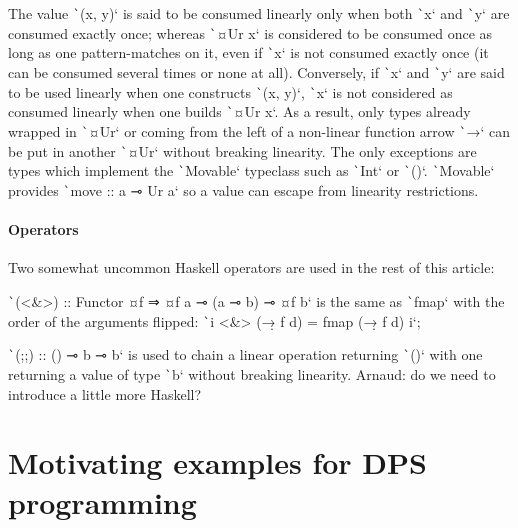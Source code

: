 \documentclass[english]{jflart}
\newcommand{\TODO}[1]{{\color{red}\large #1}}
\begin{document}
The value \texttt`(x, y)` is said to be consumed linearly only when both \texttt`x` and \texttt`y` are consumed exactly once; whereas \texttt`¤Ur x` is considered to be consumed once as long as one pattern-matches on it, even if \texttt`x` is not consumed exactly once (it can be consumed several times or none at all). Conversely, if \texttt`x` and \texttt`y` are said to be used linearly when one constructs \texttt`(x, y)`, \texttt`x` is not considered as consumed linearly when one builds \texttt`¤Ur x`. As a result, only types already wrapped in \texttt`¤Ur` or coming from the left of a non-linear function arrow \texttt`→` can be put in another \texttt`¤Ur` without breaking linearity. The only exceptions are types which implement the \texttt`Movable` typeclass such as \texttt`Int` or \texttt`()`. \texttt`Movable` provides \texttt`move :: a ⊸ Ur a` so a value can escape from linearity restrictions.


\paragraph{Operators}

Two somewhat uncommon Haskell operators are used in the rest of this article:

\texttt`(<&>) :: Functor ¤f ⇒ ¤f a ⊸ (a ⊸ b) ⊸ ¤f b` is the same as \texttt`fmap` with the order of the arguments flipped: \texttt`i <&> (\d → f d) = fmap (\d → f d) i`;%

\texttt`(;;) :: () ⊸ b ⊸ b` is used to chain a linear operation returning \texttt`()` with one returning a value of type \texttt`b` without breaking linearity.
\TODO{Arnaud: do we need to introduce a little more Haskell?}

\section{Motivating examples for DPS programming}\label{sec:motivating-examples}
\end{document}
